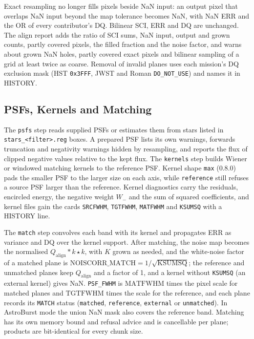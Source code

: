 \documentclass[11pt,a4paper]{article}
\newcommand{\code}[1]{\texttt{\small #1}}
\begin{document}
    Exact resampling no longer fills pixels beside NaN input: an output pixel that overlaps NaN input beyond the map tolerance becomes NaN, with NaN ERR and the OR of every contributor's DQ. Bilinear SCI, ERR and DQ are unchanged. The align report adds the ratio of SCI sums, NaN input, output and grown counts, partly covered pixels, the filled fraction and the noise factor, and warns about grown NaN holes, partly covered exact pixels and bilinear sampling of a grid at least twice as coarse. Removal of invalid planes uses each mission's DQ exclusion mask (HST \code{0x3FFF}, JWST and Roman \code{DO\_NOT\_USE}) and names it in HISTORY.

    \subsection{PSFs, Kernels and Matching}
    \label{sec:psfmatch}

    The \code{psfs} step reads supplied PSFs or estimates them from stars listed in \code{stars\_<filter>.reg} boxes. A prepared PSF lists its own warnings, forwards truncation and negativity warnings hidden by resampling, and reports the flux of clipped negative values relative to the kept flux. The \code{kernels} step builds Wiener or windowed matching kernels to the reference PSF. Kernel shape \code{max} (0.8.0) pads the smaller PSF to the larger size on each axis, while \code{reference} still refuses a source PSF larger than the reference. Kernel diagnostics carry the residuals, encircled energy, the negative weight $W_{-}$ and the sum of squared coefficients, and kernel files gain the cards \code{SRCFWHM}, \code{TGTFWHM}, \code{MATFWHM} and \code{KSUMSQ} with a HISTORY line.

    The \code{match} step convolves each band with its kernel and propagates ERR as variance and DQ over the kernel support. After matching, the noise map becomes the normalised $Q_{\mathrm{align}} \ast k \star k$, with $K$ grown as needed, and the white-noise factor of a matched plane is $\mathrm{NOISCORR\_MATCH} = 1/\sqrt{\mathrm{KSUMSQ}}$; the reference and unmatched planes keep $Q_{\mathrm{align}}$ and a factor of 1, and a kernel without \code{KSUMSQ} (an external kernel) gives NaN. \code{PSF\_FWHM} is $\mathrm{MATFWHM}$ times the pixel scale for matched planes and $\mathrm{TGTFWHM}$ times the scale for the reference, and each plane records its \code{MATCH} status (\code{matched}, \code{reference}, \code{external} or \code{unmatched}). In AstroBurst mode the union NaN mask also covers the reference band. Matching has its own memory bound and refusal advice and is cancellable per plane; products are bit-identical for every chunk size.
\end{document}
